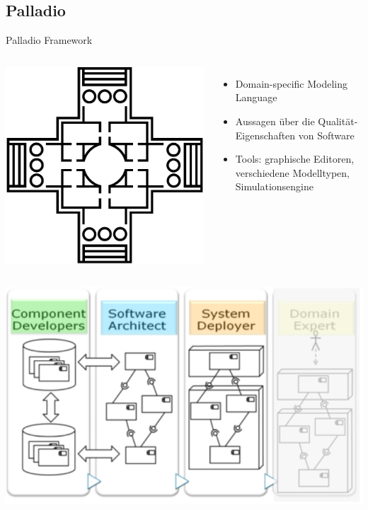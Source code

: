 \documentclass{sdqbeamer}
\begin{document}
\subsection{Palladio}
\begin{frame}{Palladio Framework}
\begin{columns}
\includegraphics[width=\textwidth]{palladio.pdf}
\begin{itemize}
\item Domain-specific Modeling Language
\item Aussagen über die Qualität-Eigenschaften von Software
\item Tools: graphische Editoren, verschiedene Modelltypen, Simulationsengine
\end{itemize}
\end{columns}
\end{frame}
\begin{frame}
\centering
\includegraphics[width=.8\textwidth]{palladio_sichten.drawio.pdf}
\end{frame}
\end{document}
